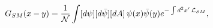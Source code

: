 \begin{equation}
G_{SM}(x-y)=\frac{1}{\cal N}\int [d\psi][d\bar{\psi}][dA]\,
\psi(x) \bar{\psi}(y) e^{ -\int d^2x'\, {\cal L}_{SM}},
\label{corrSM}
\end{equation}

